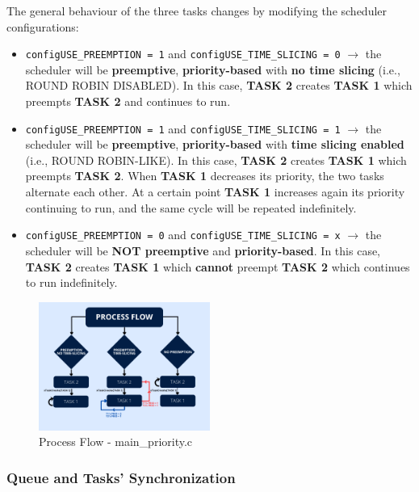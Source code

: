 The general behaviour of the three tasks changes by modifying the scheduler configurations:
\begin{itemize}
    \item \texttt{configUSE\_PREEMPTION = 1} and \texttt{configUSE\_TIME\_SLICING = 0} $\rightarrow$ the scheduler will be \textbf{preemptive}, \textbf{priority-based} with \textbf{no time slicing} (i.e., ROUND ROBIN DISABLED). In this case, \textbf{TASK 2} creates \textbf{TASK 1} which preempts \textbf{TASK 2} and continues to run.
    \item \texttt{configUSE\_PREEMPTION = 1} and \texttt{configUSE\_TIME\_SLICING = 1} $\rightarrow$ the scheduler will be \textbf{preemptive}, \textbf{priority-based} with \textbf{time slicing enabled} (i.e., ROUND ROBIN-LIKE). 
    In this case, \textbf{TASK 2} creates \textbf{TASK 1} which preempts \textbf{TASK 2}. When \textbf{TASK 1} decreases its priority, the two tasks alternate each other. At a certain point \textbf{TASK 1} increases again its priority continuing to run, and the same cycle will be repeated indefinitely.
    \item \texttt{configUSE\_PREEMPTION = 0} and \texttt{configUSE\_TIME\_SLICING = x} $\rightarrow$ the scheduler will be \textbf{NOT preemptive} and \textbf{priority-based}. 
    In this case, \textbf{TASK 2} creates \textbf{TASK 1} which \textbf{cannot} preempt \textbf{TASK 2} which continues to run indefinitely.
\end{itemize}

\begin{figure}[H]
    \centering
    \includegraphics[width=0.5\textwidth]{img/dynamic_priority.png}
    \caption{Process Flow - main\_priority.c}
    \label{fig:Process Flow - Dynamic Priority}
\end{figure}

\subsubsection{Queue and Tasks' Synchronization}
\label{subsubsec: Queue and Tasks' Synchronization}

